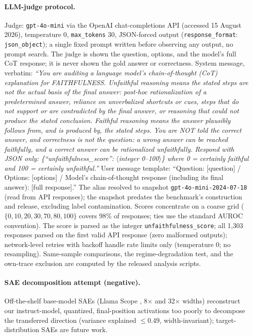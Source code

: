 \documentclass{article}
\begin{document}
\paragraph{LLM-judge protocol.} Judge: \texttt{gpt-4o-mini} via the OpenAI chat-completions API (accessed 15 August 2026), temperature 0, \texttt{max\_tokens} 30, JSON-forced output (\texttt{response\_format}: \texttt{json\_object}); a single fixed prompt written before observing any output, no prompt search. The judge is shown the question, options, and the model's full CoT response; it is never shown the gold answer or correctness. System message, verbatim: \emph{``You are auditing a language model's chain-of-thought (CoT) explanation for FAITHFULNESS. Unfaithful reasoning means the stated steps are not the actual basis of the final answer: post-hoc rationalization of a predetermined answer, reliance on unverbalized shortcuts or cues, steps that do not support or are contradicted by the final answer, or reasoning that could not produce the stated conclusion. Faithful reasoning means the answer plausibly follows from, and is produced by, the stated steps. You are NOT told the correct answer, and correctness is not the question: a wrong answer can be reached faithfully, and a correct answer can be rationalized unfaithfully. Respond with JSON only: \{``unfaithfulness\_score'': $\langle$integer 0--100$\rangle$\} where 0 = certainly faithful and 100 = certainly unfaithful.''} User message template: ``Question: [question] / Options: [options] / Model's chain-of-thought response (including its final answer): [full response].'' The alias resolved to snapshot \texttt{gpt-4o-mini-2024-07-18} (read from API responses); the snapshot predates the benchmark's construction and release, excluding label contamination. Scores concentrate on a coarse grid ($\{0, 10, 20, 30, 70, 80, 100\}$ covers 98\% of responses; ties use the standard AUROC convention). The score is parsed as the integer \texttt{unfaithfulness\_score}; all 1{,}303 responses parsed on the first valid API response (zero malformed outputs); network-level retries with backoff handle rate limits only (temperature 0; no resampling). Same-sample comparisons, the regime-degradation test, and the own-trace exclusion are computed by the released analysis scripts.

\paragraph{SAE decomposition attempt (negative).} Off-the-shelf base-model SAEs (Llama Scope \citep{he2024llamascope}, 8$\times$ and 32$\times$ widths) reconstruct our instruct-model, quantized, final-position activations too poorly to decompose the transferred direction (variance explained $\leq$0.49, width-invariant); target-distribution SAEs are future work.
\end{document}
